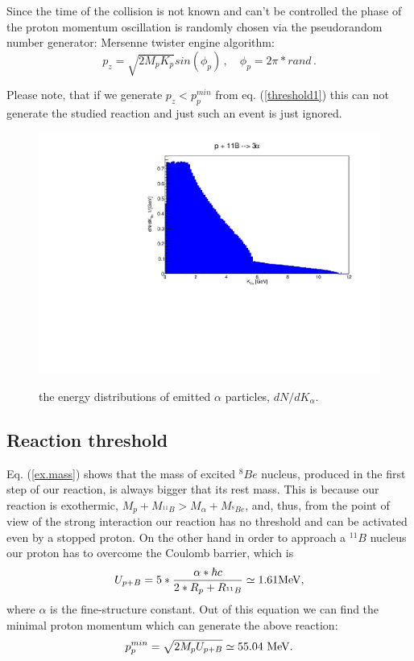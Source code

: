 \documentclass[aps,prc,twocolumn,floatfix,showpacs,a4paper,
nofootinbib,amsmath,amssymb]{revtex4}
\newcommand{\be}{\begin{equation}}
\newcommand{\ee}{\end{equation}}
\begin{document}
Since the time of the collision is not known and can't be controlled the phase of the proton momentum oscillation is randomly chosen via the pseudorandom number generator: Mersenne twister engine algorithm: 
\begin{equation}
	p_z =\sqrt{2M_pK_p} sin(\phi_p) \,, \quad \phi_p=2\pi*rand\,.
\end{equation}

Please note, that if we generate $p_z < p_p^{min}$ from eq. (\ref{threshold1}) this can not generate the studied reaction and just such an event is just ignored.  


\begin{figure}[h]
	\begin{center}
		\resizebox{0.98\columnwidth}{!}
		{\includegraphics{dNdK.pdf}}
		\caption{ the energy distributions of emitted $\alpha$ particles, $dN/dK_{\alpha}$.
		}
		\label{dNdK}
	\end{center}
\end{figure} 

\subsection{Reaction threshold}
Eq. (\ref{ex.mass}) shows that the mass of excited $^8Be$ nucleus, produced in the first step of our reaction, is always bigger that its rest mass. This is because our reaction is exothermic,  $M_p + M_{^{11}B} > M_{\alpha}+M_{^8Be}$, and, thus, from the point of view of the strong interaction our reaction has no threshold and can be activated even by a stopped proton. On the other hand in order to approach a $^{11}B$ nucleus our proton has to overcome the Coulomb barrier, which is 
\begin{equation}
U_{p+B}=5*\frac{\alpha*\hbar c}{2*R_p+R_{^{11}B}}\simeq 1.61 {\rm MeV},
\end{equation}
where $\alpha$ is the fine-structure constant. Out of this equation we can find the minimal proton momentum which can generate the above reaction: 
\be
p_p^{min}=\sqrt{2 M_p U_{p+B}}\simeq 55.04\ {\rm MeV}.
\label{threshold1}
\ee
\end{document}
